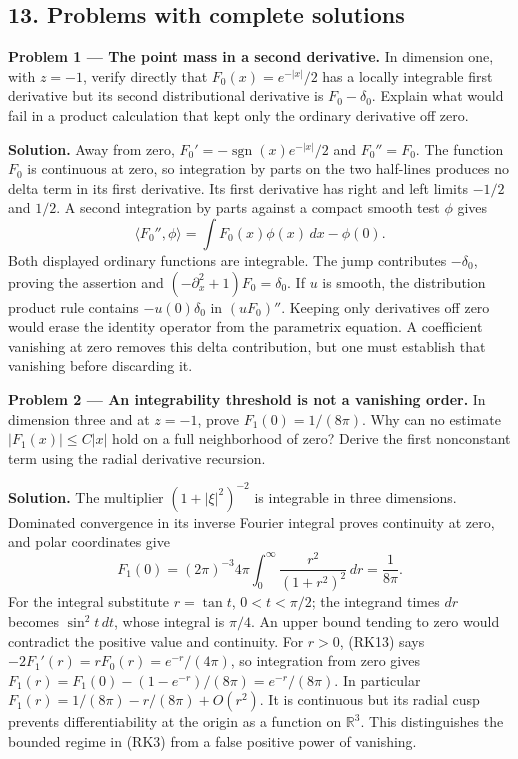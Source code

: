 \documentclass[
  11pt,
]{article}
\begin{document}
\subsection{13. Problems with complete
solutions}\label{problems-with-complete-solutions}

\textbf{Problem 1 --- The point mass in a second derivative.} In
dimension one, with \(z=-1\), verify directly that \(F_0(x)=e^{-|x|}/2\)
has a locally integrable first derivative but its second distributional
derivative is \(F_0-\delta_0\). Explain what would fail in a product
calculation that kept only the ordinary derivative off zero.

\textbf{Solution.} Away from zero,
\(F_0'=-\operatorname{sgn}(x)e^{-|x|}/2\) and \(F_0''=F_0\). The
function \(F_0\) is continuous at zero, so integration by parts on the
two half-lines produces no delta term in its first derivative. Its first
derivative has right and left limits \(-1/2\) and \(1/2\). A second
integration by parts against a compact smooth test \(\phi\) gives \[
               \langle F_0'',\phi\rangle
                      =\int F_0(x)\phi(x)\,dx-\phi(0).       \tag{HP1}
\] Both displayed ordinary functions are integrable. The jump
contributes \(-\delta_0\), proving the assertion and
\((-\partial_x^2+1)F_0=\delta_0\). If \(u\) is smooth, the distribution
product rule contains \(-u(0)\delta_0\) in \((uF_0)''\). Keeping only
derivatives off zero would erase the identity operator from the
parametrix equation. A coefficient vanishing at zero removes this delta
contribution, but one must establish that vanishing before discarding
it.

\textbf{Problem 2 --- An integrability threshold is not a vanishing
order.} In dimension three and at \(z=-1\), prove \(F_1(0)=1/(8\pi)\).
Why can no estimate \(|F_1(x)|\leq C|x|\) hold on a full neighborhood of
zero? Derive the first nonconstant term using the radial derivative
recursion.

\textbf{Solution.} The multiplier \((1+|\xi|^2)^{-2}\) is integrable in
three dimensions. Dominated convergence in its inverse Fourier integral
proves continuity at zero, and polar coordinates give \[
 F_1(0)=(2\pi)^{-3}4\pi\int_0^\infty
                     \frac{r^2}{(1+r^2)^2}\,dr=\frac1{8\pi}.
                                                               \tag{HP2}
\] For the integral substitute \(r=\tan t\), \(0<t<\pi/2\); the
integrand times \(dr\) becomes \(\sin^2t\,dt\), whose integral is
\(\pi/4\). An upper bound tending to zero would contradict the positive
value and continuity. For \(r>0\), (RK13) says
\(-2F_1'(r)=rF_0(r)=e^{-r}/(4\pi)\), so integration from zero gives
\(F_1(r)=F_1(0)-(1-e^{-r})/(8\pi)=e^{-r}/(8\pi)\). In particular
\(F_1(r)=1/(8\pi)-r/(8\pi)+O(r^2)\). It is continuous but its radial
cusp prevents differentiability at the origin as a function on
\(\mathbb R^3\). This distinguishes the bounded regime in (RK3) from a
false positive power of vanishing.
\end{document}
